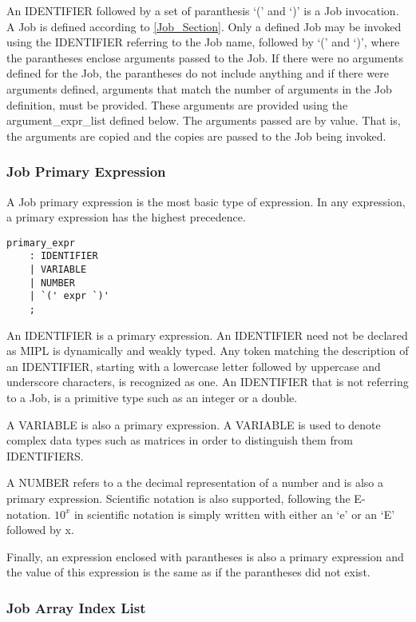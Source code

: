 \documentclass[prodmode,acmtecs]{acmsmall}
\begin{document}
An IDENTIFIER followed by a set of paranthesis `(' and `)' is a Job
invocation. A Job is defined according to \ref{Job_Section}. Only a defined
Job may be invoked using the IDENTIFIER referring to the Job name,
followed by `(' and `)', where the parantheses enclose arguments passed
to the Job. If there were no arguments defined for the Job, the
parantheses do not include anything and if there were arguments defined, 
arguments that match the number of arguments in the Job definition, must
be provided. These arguments are provided using the argument\_expr\_list 
defined below. The arguments passed are by value. That is, the arguments 
are copied and the copies are passed to the Job being invoked.

\subsubsection{Job Primary Expression}

A Job primary expression is the most basic type of expression. In any
expression, a primary expression has the highest precedence.

\begin{lstlisting}
primary_expr
	: IDENTIFIER
	| VARIABLE
	| NUMBER
	| `(' expr `)'
	;
\end{lstlisting}

An IDENTIFIER is a primary expression. An IDENTIFIER need not be declared
as MIPL is dynamically and weakly typed. Any token matching the description
of an IDENTIFIER, starting with a lowercase letter followed by uppercase and
underscore characters, is recognized as one. An IDENTIFIER that is not 
referring to a Job, is a primitive type such as an integer or a double.

A VARIABLE is also a primary expression. A VARIABLE is used to denote complex 
data types such as matrices in order to distinguish them from IDENTIFIERS.

A NUMBER refers to a the decimal representation of a number and is also a 
primary expression. Scientific notation is also supported, following the 
E-notation. $10^{x}$ in scientific notation is simply written with either an
`e' or an `E' followed by x.

Finally, an expression enclosed with parantheses is also a primary expression 
and the value of this expression is the same as if the parantheses did not 
exist.

\subsubsection{Job Array Index List}
\end{document}
